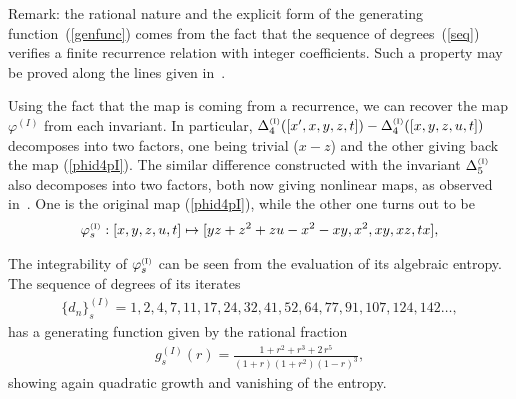 \documentclass[reqno]{amsart}
\numberwithin{equation}{section}
\numberwithin{figure}{section}
\begin{document}
Remark: the rational nature and the explicit form of the generating
function~(\ref{genfunc}) comes from the fact that the sequence of
degrees~(\ref{seq}) verifies a finite recurrence relation with integer
coefficients. Such a property may be proved along the lines given
in~\cite{Vi15}.

Using the fact that the map is coming from a recurrence, we can
recover the map $\varphi^{(\scriptscriptstyle I)}$ from each
invariant.  In particular, $\Delta^{\scriptscriptstyle (\rm I) }_4( [
  x',x,y,z,t] ) - \Delta^{\scriptscriptstyle (\rm I) }_4( [
  x,y,z,u,t])$ decomposes into two factors, one being trivial ($x-z$)
and the other giving back the map (\ref{phid4pI}). The similar
difference constructed with the invariant $\Delta^{\scriptscriptstyle
  (\rm I)}_5$ also decomposes into two factors, both now giving
nonlinear maps, as observed in~\cite{QuCaRo05}. One is the original map
(\ref{phid4pI}), while the other one turns out to be
\begin{eqnarray}
\label{phid4pIs}
\varphi^{\scriptscriptstyle (\rm I) }_s: [x,y,z,u,t] \mapsto [yz+{z}^{2}+zu-{x}^{2}-xy,{x}^{2},xy,xz,tx],
\end{eqnarray}


The integrability of $\varphi^{\scriptscriptstyle (\rm I) }_s$ can be seen from the evaluation of
its algebraic entropy. The sequence of degrees of its iterates 
\begin{eqnarray*}
 \{d_n\}_s^{ (\scriptscriptstyle I)} = 1, 2, 4, 7, 11, 17, 24, 32, 41, 52, 64, 77, 91, 107, 124, 142  \dots ,
\end{eqnarray*}
 has a generating function given by the rational fraction
\begin{eqnarray}
  g_s^{ (\scriptscriptstyle I)}(r) = 
{\frac {1+{r}^{2}+{r}^{3}+2\,{r}^{5}}{ \left(1+ r \right)  \left(1+ {r}
^{2} \right)  \left( 1-r \right) ^{3}}},
\end{eqnarray}
showing again quadratic growth and vanishing of the  entropy.
\end{document}
